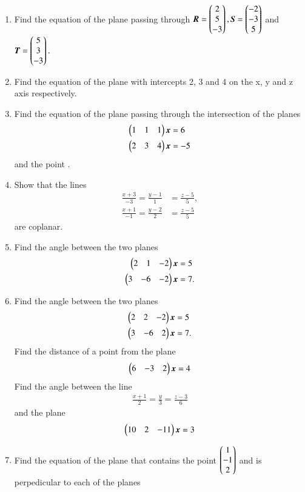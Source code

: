 \begin{enumerate}[label=\arabic*.,ref=\thesubsection.\theenumi]
\item Find the equation of the plane passing through 
$
\bm{R} = \begin{pmatrix}2\\5\\-3\end{pmatrix},
\bm{S}= \begin{pmatrix}-2\\-3\\5\end{pmatrix}
$ 
and 
$
\bm{T}= \begin{pmatrix}5\\3\\-3\end{pmatrix}.
$
\item Find the equation of the plane with intercepts 2, 3 and 4 on the x, y and z axis respectively.
\item Find the equation of the plane passing through the intersection of the planes 
\begin{align}
\begin{pmatrix}1 & 1 & 1\end{pmatrix}\bm{x}&=6  
\\
\begin{pmatrix}2 & 3 & 4\end{pmatrix}\bm{x}&=-5
\end{align}
%
and the point .
\item Show that the lines 
\begin{align}
\frac{x+3}{-3} = \frac{y-1}{1} &= \frac{z-5}{5}, 
\\
\frac{x+1}{-1} = \frac{y-2}{2} &= \frac{z-5}{5} 
\end{align}
%
are coplanar.
\item Find the angle between the two planes
\begin{align}
\begin{pmatrix}2 & 1 & -2\end{pmatrix}\bm{x}&=5
\\
\begin{pmatrix}3 &-6 & -2\end{pmatrix}\bm{x}&=7.
\end{align}
%
\item Find the angle between the two planes
\begin{align}
\begin{pmatrix}2 & 2 & -2\end{pmatrix}\bm{x}&=5
\\
\begin{pmatrix}3 &-6 & 2\end{pmatrix}\bm{x}&=7.
\end{align}
%
Find the distance of a point  from the plane
\begin{align}
\begin{pmatrix}6 & -3 & 2\end{pmatrix}\bm{x}=4
\end{align}
%
Find the angle between the line 
%
\begin{align}
\frac{x+1}{2} = \frac{y}{3} = \frac{z-3}{6} 
\end{align}
%
and
%
the plane 
\begin{align}
\begin{pmatrix}10 & 2 & -11\end{pmatrix}\bm{x}=3
\end{align}
%
\item Find the equation of the plane that contains the point $\begin{pmatrix}1\\-1\\2\end{pmatrix}$ and is perpedicular to each of the planes

\end{enumerate}
